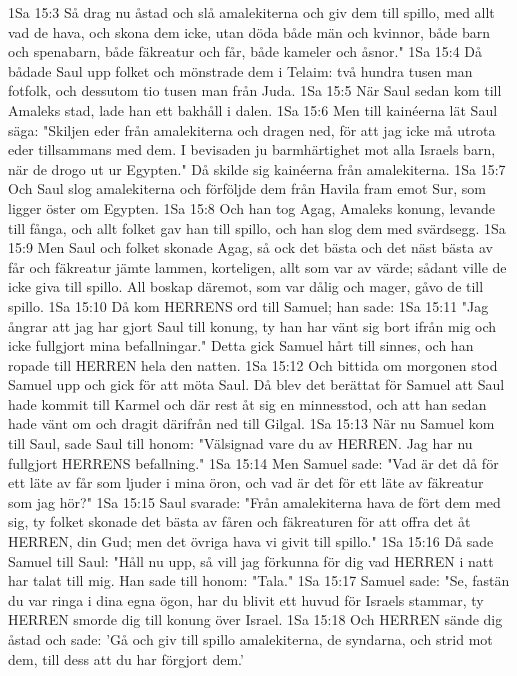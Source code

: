 1Sa 15:3  Så drag nu åstad och slå amalekiterna och giv dem till spillo, med allt vad de hava, och skona dem icke, utan döda både män och kvinnor, både barn och spenabarn, både fäkreatur och får, både kameler och åsnor."
1Sa 15:4  Då bådade Saul upp folket och mönstrade dem i Telaim: två hundra tusen man fotfolk, och dessutom tio tusen man från Juda.
1Sa 15:5  När Saul sedan kom till Amaleks stad, lade han ett bakhåll i dalen.
1Sa 15:6  Men till kainéerna lät Saul säga: "Skiljen eder från amalekiterna och dragen ned, för att jag icke må utrota eder tillsammans med dem. I bevisaden ju barmhärtighet mot alla Israels barn, när de drogo ut ur Egypten." Då skilde sig kainéerna från amalekiterna.
1Sa 15:7  Och Saul slog amalekiterna och förföljde dem från Havila fram emot Sur, som ligger öster om Egypten.
1Sa 15:8  Och han tog Agag, Amaleks konung, levande till fånga, och allt folket gav han till spillo, och han slog dem med svärdsegg.
1Sa 15:9  Men Saul och folket skonade Agag, så ock det bästa och det näst bästa av får och fäkreatur jämte lammen, korteligen, allt som var av värde; sådant ville de icke giva till spillo. All boskap däremot, som var dålig och mager, gåvo de till spillo.
1Sa 15:10  Då kom HERRENS ord till Samuel; han sade:
1Sa 15:11  "Jag ångrar att jag har gjort Saul till konung, ty han har vänt sig bort ifrån mig och icke fullgjort mina befallningar." Detta gick Samuel hårt till sinnes, och han ropade till HERREN hela den natten.
1Sa 15:12  Och bittida om morgonen stod Samuel upp och gick för att möta Saul. Då blev det berättat för Samuel att Saul hade kommit till Karmel och där rest åt sig en minnesstod, och att han sedan hade vänt om och dragit därifrån ned till Gilgal.
1Sa 15:13  När nu Samuel kom till Saul, sade Saul till honom: "Välsignad vare du av HERREN. Jag har nu fullgjort HERRENS befallning."
1Sa 15:14  Men Samuel sade: "Vad är det då för ett läte av får som ljuder i mina öron, och vad är det för ett läte av fäkreatur som jag hör?"
1Sa 15:15  Saul svarade: "Från amalekiterna hava de fört dem med sig, ty folket skonade det bästa av fåren och fäkreaturen för att offra det åt HERREN, din Gud; men det övriga hava vi givit till spillo."
1Sa 15:16  Då sade Samuel till Saul: "Håll nu upp, så vill jag förkunna för dig vad HERREN i natt har talat till mig. Han sade till honom: "Tala."
1Sa 15:17  Samuel sade: "Se, fastän du var ringa i dina egna ögon, har du blivit ett huvud för Israels stammar, ty HERREN smorde dig till konung över Israel.
1Sa 15:18  Och HERREN sände dig åstad och sade: 'Gå och giv till spillo amalekiterna, de syndarna, och strid mot dem, till dess att du har förgjort dem.'
